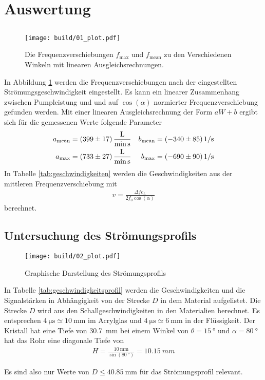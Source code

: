 \section{Auswertung}
\subsection{}

\begin{figure}
    \centering
    \texttt{[image: build/01\_plot.pdf]}
    \caption{Die Frequenzverschiebungen $f_\text{max}$ und $f_\text{mean}$ zu den Verschiedenen Winkeln mit linearen Ausgleichsrechnungen.}
    \label{fig:frequenzen}
\end{figure}

In Abbildung \ref{fig:frequenzen} werden die Frequenzverschiebungen nach der eingestellten Strömungsgeschwindigkeit eingestellt.
Es kann ein linearer Zusammenhang zwischen Pumpleistung und und auf $\cos(\alpha)$ normierter Frequenzverschiebung gefunden werden.
Mit einer linearen Ausgleichsrechnung  der Form $a W +b$ ergibt sich für die gemessenen Werte folgende Parameter
\begin{align}
    a_\text{mean} &=  \qty{399  \pm 17}{\liter\per\minute\per\second} &
    b_\text{mean} &=  \qty{-340 \pm 85}{1\per\second}                 \\
    a_\text{max}  &=  \qty{733  \pm 27}{\liter\per\minute\per\second} &
    b_\text{max}  &=  \qty{-690 \pm 90}{1\per\second}                 
\end{align}
In Tabelle \ref{tab:geschwindigkeiten} werden die Geschwindigkeiten aus der mittleren Frequenzverschiebung mit
\begin{align}
    v = \frac{\Delta f  c_L }{2 f_0  \cos(\alpha)}
\end{align}
berechnet.

\subsection{Untersuchung des Strömungsprofils}

\begin{figure}[H]
    \centering
    \texttt{[image: build/02\_plot.pdf]}
    \caption{Graphische Darstellung des Strömungsprofils}
    \label{fig:geschwindigkeitsprofil}
\end{figure}

In Tabelle \ref{tab:geschwindigkeitsprofil} werden die Geschwindigkeiten und die Signalstärken in Abhängigkeit von der
Strecke $D$ in dem Material aufgelistet.
Die Strecke $D$ wird aus den Schallgeschwindigkeiten in den Materialien berechnet.
Es entsprechen $\qty{4}{\micro\s} \simeq \qty{10}{\mm}$ im Acrylglas und $\qty{4}{\micro\s} \simeq \qty{6}{\mm}$ in der Flüssigkeit.
Der Kristall hat eine Tiefe von \qty{30.7}{\mm} bei einem Winkel von $\theta = \qty{15}{\degree}$ und $\alpha = \qty{80}{\degree}$
hat das Rohr eine diagonale Tiefe von
\begin{align}
    H = \frac{\qty{10}{\mm}}{\sin(\qty{80}{\degree})} = \qty{10.15}{mm}
\end{align}

Es sind also nur Werte von $D \leq \qty{40.85}{\mm}$ für das Strömungsprofil relevant.